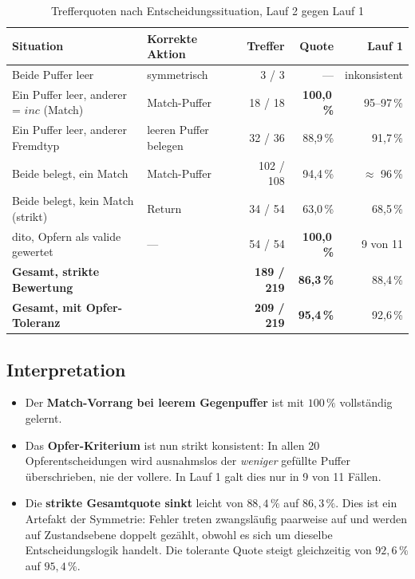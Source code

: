\documentclass[11pt,a4paper]{article}
\begin{document}
\begin{table}[htbp]
\centering
\caption{Trefferquoten nach Entscheidungssituation, Lauf 2 gegen Lauf 1}
\label{tab:policy}
\small
\begin{tabularx}{\textwidth}{@{}LlrrR{}}
\toprule
\textbf{Situation} & \textbf{Korrekte Aktion} & \textbf{Treffer} &
\textbf{Quote} & \textbf{Lauf 1} \\
\midrule
Beide Puffer leer & symmetrisch & 3 / 3 & --- & inkonsistent \\
Ein Puffer leer, anderer = $inc$ (Match) & Match-Puffer & 18 / 18 & \textbf{100,0\,\%} & 95--97\,\% \\
Ein Puffer leer, anderer Fremdtyp & leeren Puffer belegen & 32 / 36 & 88,9\,\% & 91,7\,\% \\
Beide belegt, ein Match & Match-Puffer & 102 / 108 & 94,4\,\% & $\approx$ 96\,\% \\
Beide belegt, kein Match (strikt) & Return & 34 / 54 & 63,0\,\% & 68,5\,\% \\
\quad dito, Opfern als valide gewertet & --- & 54 / 54 & \textbf{100,0\,\%} & 9 von 11 \\
\midrule
\textbf{Gesamt, strikte Bewertung} & & \textbf{189 / 219} & \textbf{86,3\,\%} & 88,4\,\% \\
\textbf{Gesamt, mit Opfer-Toleranz} & & \textbf{209 / 219} & \textbf{95,4\,\%} & 92,6\,\% \\
\bottomrule
\end{tabularx}
\end{table}

\subsection*{Interpretation}

\begin{itemize}[leftmargin=1.4em]
  \item Der \textbf{Match-Vorrang bei leerem Gegenpuffer} ist mit
        $100\,\%$ vollständig gelernt.
  \item Das \textbf{Opfer-Kriterium} ist nun strikt konsistent: In allen
        20 Opferentscheidungen wird ausnahmslos der \emph{weniger} gefüllte
        Puffer überschrieben, nie der vollere. In Lauf 1 galt dies nur in
        9 von 11 Fällen.
  \item Die \textbf{strikte Gesamtquote sinkt} leicht von $88{,}4\,\%$ auf
        $86{,}3\,\%$. Dies ist ein Artefakt der Symmetrie: Fehler treten
        zwangsläufig paarweise auf und werden auf Zustandsebene doppelt
        gezählt, obwohl es sich um dieselbe Entscheidungslogik handelt.
        Die tolerante Quote steigt gleichzeitig von $92{,}6\,\%$ auf
        $95{,}4\,\%$.
\end{itemize}
\end{document}
